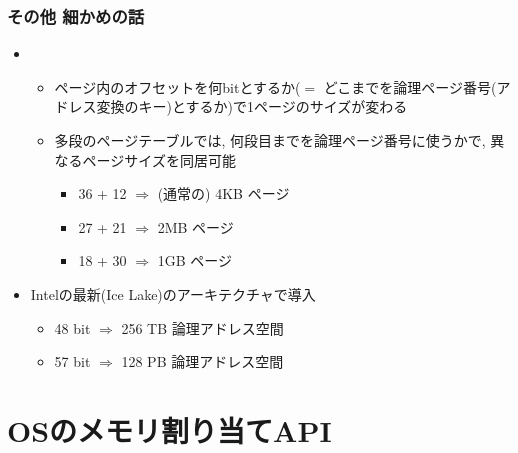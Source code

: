 \documentclass[12pt,dvipdfmx]{beamer}
\begin{document}
\begin{frame}
  \frametitle{その他 細かめの話}
  \begin{itemize}
  \item {}
    \begin{itemize}
    \item ページ内のオフセットを何bitとするか($=$ どこまでを論理ページ番号(アドレス変換のキー)とするか)で1ページのサイズが変わる
    \item 多段のページテーブルでは, 何段目までを論理ページ番号に使うかで,
      異なるページサイズを同居可能
      \begin{itemize}
      \item 36 + 12 $\Rightarrow$ (通常の) 4KB ページ
      \item 27 + 21 $\Rightarrow$ 2MB ページ
      \item 18 + 30 $\Rightarrow$ 1GB ページ
      \end{itemize}
    \end{itemize}
  \item {}
    Intelの最新(Ice Lake)のアーキテクチャで導入
    \begin{itemize}
    \item 48 bit $\Rightarrow$ 256 TB 論理アドレス空間
    \item 57 bit $\Rightarrow$ 128 PB 論理アドレス空間
    \end{itemize}
  \end{itemize}
\end{frame}

\section{OSのメモリ割り当てAPI}
\end{document}
